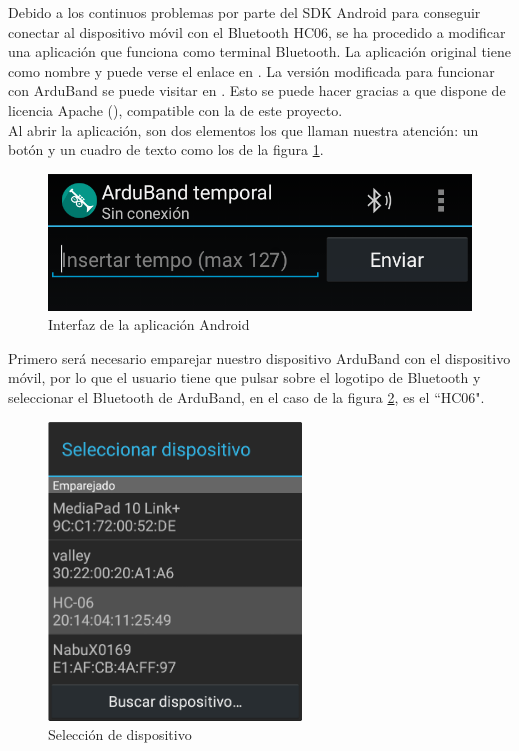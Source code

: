 Debido a los continuos problemas por parte del SDK Android \cite{googledevelopers} para conseguir conectar
al dispositivo móvil con el Bluetooth HC06, se ha procedido a modificar una aplicación
que funciona como terminal Bluetooth. La aplicación original tiene como nombre y puede verse
el enlace en \cite{bluetoothOrigin}. La versión modificada para funcionar con ArduBand se
puede visitar en \cite{bluetoothProvisional}. Esto se puede hacer gracias a que \cite{bluetoothOrigin}
dispone de licencia Apache (\cite{apacheLicense}), compatible con la de este proyecto.\\

Al abrir la aplicación, son dos elementos los que llaman nuestra atención: un botón y un cuadro
de texto como los de la figura \ref{fig:protoand1}.

\begin{figure}[!htb]
\centering
\includegraphics[width=1\textwidth]{./imagenes/arduband-android-prototipo1}
\caption{Interfaz de la aplicación Android} \label{fig:protoand1}
\end{figure}

Primero será necesario emparejar nuestro dispositivo ArduBand con el dispositivo
móvil, por lo que el usuario tiene que pulsar sobre el logotipo de Bluetooth y seleccionar
el Bluetooth de ArduBand, en el caso de la figura \ref{fig:protoand2}, es el ``HC06".

\begin{figure}[!htb]
\centering
\includegraphics[width=0.6\textwidth]{./imagenes/arduband-android-prototipo2}
\caption{Selección de dispositivo} \label{fig:protoand2}
\end{figure}

